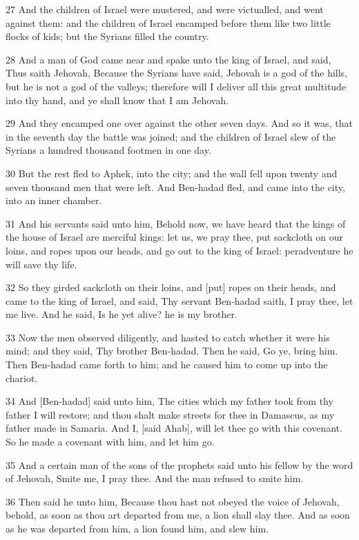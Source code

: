 \par 27 And the children of Israel were mustered, and were victualled, and went against them: and the children of Israel encamped before them like two little flocks of kids; but the Syrians filled the country.
\par 28 And a man of God came near and spake unto the king of Israel, and said, Thus saith Jehovah, Because the Syrians have said, Jehovah is a god of the hills, but he is not a god of the valleys; therefore will I deliver all this great multitude into thy hand, and ye shall know that I am Jehovah.
\par 29 And they encamped one over against the other seven days. And so it was, that in the seventh day the battle was joined; and the children of Israel slew of the Syrians a hundred thousand footmen in one day.
\par 30 But the rest fled to Aphek, into the city; and the wall fell upon twenty and seven thousand men that were left. And Ben-hadad fled, and came into the city, into an inner chamber.
\par 31 And his servants said unto him, Behold now, we have heard that the kings of the house of Israel are merciful kings: let us, we pray thee, put sackcloth on our loins, and ropes upon our heads, and go out to the king of Israel: peradventure he will save thy life.
\par 32 So they girded sackcloth on their loins, and [put] ropes on their heads, and came to the king of Israel, and said, Thy servant Ben-hadad saith, I pray thee, let me live. And he said, Is he yet alive? he is my brother.
\par 33 Now the men observed diligently, and hasted to catch whether it were his mind; and they said, Thy brother Ben-hadad. Then he said, Go ye, bring him. Then Ben-hadad came forth to him; and he caused him to come up into the chariot.
\par 34 And [Ben-hadad] said unto him, The cities which my father took from thy father I will restore; and thou shalt make streets for thee in Damascus, as my father made in Samaria. And I, [said Ahab], will let thee go with this covenant. So he made a covenant with him, and let him go.
\par 35 And a certain man of the sons of the prophets said unto his fellow by the word of Jehovah, Smite me, I pray thee. And the man refused to smite him.
\par 36 Then said he unto him, Because thou hast not obeyed the voice of Jehovah, behold, as soon as thou art departed from me, a lion shall slay thee. And as soon as he was departed from him, a lion found him, and slew him.
